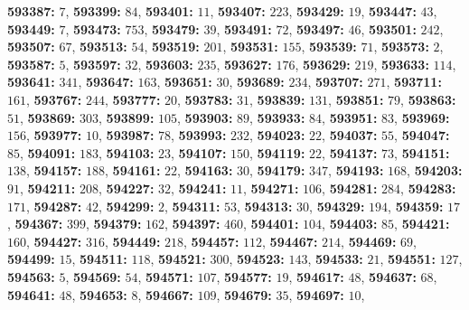 \textsf{\bfseries 593387:} $7$, \textsf{\bfseries 593399:} $84$, \textsf{\bfseries 593401:} $11$, \textsf{\bfseries 593407:} $223$, \textsf{\bfseries 593429:} $19$, \textsf{\bfseries 593447:} $43$, \textsf{\bfseries 593449:} $7$, \textsf{\bfseries 593473:} $753$, \textsf{\bfseries 593479:} $39$, \textsf{\bfseries 593491:} $72$, \textsf{\bfseries 593497:} $46$, \textsf{\bfseries 593501:} $242$, \textsf{\bfseries 593507:} $67$, \textsf{\bfseries 593513:} $54$, \textsf{\bfseries 593519:} $201$, \textsf{\bfseries 593531:} $155$, \textsf{\bfseries 593539:} $71$, \textsf{\bfseries 593573:} $2$, \textsf{\bfseries 593587:} $5$, \textsf{\bfseries 593597:} $32$, \textsf{\bfseries 593603:} $235$, \textsf{\bfseries 593627:} $176$, \textsf{\bfseries 593629:} $219$, \textsf{\bfseries 593633:} $114$, \textsf{\bfseries 593641:} $341$, \textsf{\bfseries 593647:} $163$, \textsf{\bfseries 593651:} $30$, \textsf{\bfseries 593689:} $234$, \textsf{\bfseries 593707:} $271$, \textsf{\bfseries 593711:} $161$, \textsf{\bfseries 593767:} $244$, \textsf{\bfseries 593777:} $20$, \textsf{\bfseries 593783:} $31$, \textsf{\bfseries 593839:} $131$, \textsf{\bfseries 593851:} $79$, \textsf{\bfseries 593863:} $51$, \textsf{\bfseries 593869:} $303$, \textsf{\bfseries 593899:} $105$, \textsf{\bfseries 593903:} $89$, \textsf{\bfseries 593933:} $84$, \textsf{\bfseries 593951:} $83$, \textsf{\bfseries 593969:} $156$, \textsf{\bfseries 593977:} $10$, \textsf{\bfseries 593987:} $78$, \textsf{\bfseries 593993:} $232$, \textsf{\bfseries 594023:} $22$, \textsf{\bfseries 594037:} $55$, \textsf{\bfseries 594047:} $85$, \textsf{\bfseries 594091:} $183$, \textsf{\bfseries 594103:} $23$, \textsf{\bfseries 594107:} $150$, \textsf{\bfseries 594119:} $22$, \textsf{\bfseries 594137:} $73$, \textsf{\bfseries 594151:} $138$, \textsf{\bfseries 594157:} $188$, \textsf{\bfseries 594161:} $22$, \textsf{\bfseries 594163:} $30$, \textsf{\bfseries 594179:} $347$, \textsf{\bfseries 594193:} $168$, \textsf{\bfseries 594203:} $91$, \textsf{\bfseries 594211:} $208$, \textsf{\bfseries 594227:} $32$, \textsf{\bfseries 594241:} $11$, \textsf{\bfseries 594271:} $106$, \textsf{\bfseries 594281:} $284$, \textsf{\bfseries 594283:} $171$, \textsf{\bfseries 594287:} $42$, \textsf{\bfseries 594299:} $2$, \textsf{\bfseries 594311:} $53$, \textsf{\bfseries 594313:} $30$, \textsf{\bfseries 594329:} $194$, \textsf{\bfseries 594359:} $17$, \textsf{\bfseries 594367:} $399$, \textsf{\bfseries 594379:} $162$, \textsf{\bfseries 594397:} $460$, \textsf{\bfseries 594401:} $104$, \textsf{\bfseries 594403:} $85$, \textsf{\bfseries 594421:} $160$, \textsf{\bfseries 594427:} $316$, \textsf{\bfseries 594449:} $218$, \textsf{\bfseries 594457:} $112$, \textsf{\bfseries 594467:} $214$, \textsf{\bfseries 594469:} $69$, \textsf{\bfseries 594499:} $15$, \textsf{\bfseries 594511:} $118$, \textsf{\bfseries 594521:} $300$, \textsf{\bfseries 594523:} $143$, \textsf{\bfseries 594533:} $21$, \textsf{\bfseries 594551:} $127$, \textsf{\bfseries 594563:} $5$, \textsf{\bfseries 594569:} $54$, \textsf{\bfseries 594571:} $107$, \textsf{\bfseries 594577:} $19$, \textsf{\bfseries 594617:} $48$, \textsf{\bfseries 594637:} $68$, \textsf{\bfseries 594641:} $48$, \textsf{\bfseries 594653:} $8$, \textsf{\bfseries 594667:} $109$, \textsf{\bfseries 594679:} $35$, \textsf{\bfseries 594697:} $10$, 
